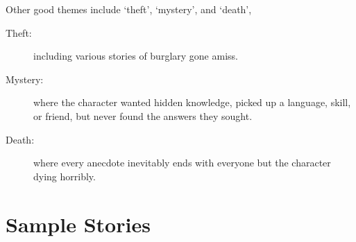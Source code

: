 \begin{multicols}{2}
Other good themes include `theft', `mystery', and `death', 

\begin{description}
  \item[Theft:]
  including various stories of burglary gone amiss.
  \item[Mystery:]
  where the character wanted hidden knowledge, picked up a language, skill, or friend, but never found the answers they sought.
  \item[Death:]
  where every anecdote inevitably ends with everyone but the character dying horribly.
\end{description}

\end{multicols}

\section{Sample Stories}


